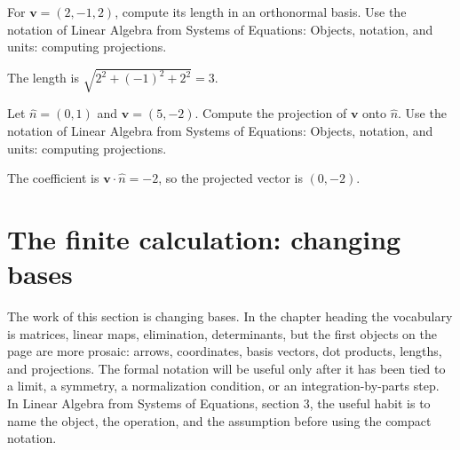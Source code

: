 \begin{exercise}
For \(\bm v=(2,-1,2)\), compute its length in an orthonormal basis.  Use the notation of Linear Algebra from Systems of Equations: Objects, notation, and units: computing projections.
\begin{answer}
The length is \(\sqrt{2^2+(-1)^2+2^2}=3\).
\end{answer}
\end{exercise}

\begin{exercise}
Let \(\hat n=(0,1)\) and \(\bm v=(5,-2)\).  Compute the projection of \(\bm v\) onto \(\hat n\).  Use the notation of Linear Algebra from Systems of Equations: Objects, notation, and units: computing projections.
\begin{answer}
The coefficient is \(\bm v\cdot\hat n=-2\), so the projected vector is \((0,-2)\).
\end{answer}
\end{exercise}



\section{The finite calculation: changing bases}













The work of this section is changing bases.  In the chapter heading the vocabulary is matrices, linear maps, elimination, determinants, but the first objects on the page are more prosaic: arrows, coordinates, basis vectors, dot products, lengths, and projections.  The formal notation will be useful only after it has been tied to a limit, a symmetry, a normalization condition, or an integration-by-parts step.  In Linear Algebra from Systems of Equations, section 3, the useful habit is to name the object, the operation, and the assumption before using the compact notation.

